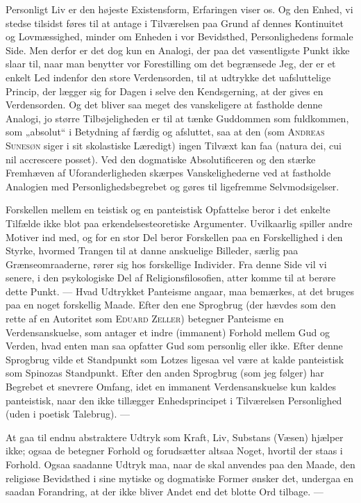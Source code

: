 \documentclass[12pt,a4paper,openany]{book}
\newcommand{\opage}[1]{\marginnote{\footnotesize\textit{[#1]}}}
\begin{document}
Personligt Liv er den højeste Existensform, Erfaringen viser os. Og den
Enhed, vi stedse tilsidst føres til at antage i Tilværelsen paa Grund af
dennes Kontinuitet og Lovmæssighed, minder om Enheden i vor Bevidsthed,
Personlighedens formale Side. Men derfor er det dog kun en Analogi, der
paa det væsentligste Punkt ikke slaar til, naar man benytter vor
Forestilling om det begrænsede Jeg, der er et enkelt Led indenfor den
store Verdensorden, til at udtrykke det uafsluttelige Princip, der
lægger sig for Dagen i selve den Kendsgerning, at der gives en
Verdensorden. Og det bliver saa meget des vanskeligere at fastholde
denne Analogi, jo større Tilbøjeligheden er til at tænke Guddommen som
fuldkommen, som „absolut“ i Betydning af færdig og afsluttet, saa at den
(som \textsc{Andreas Sunesøn} siger i sit skolastiske Læredigt) ingen
Tilvæxt kan faa (natura dei, cui nil accrescere posset). Ved den
dogmatiske Absolutificeren og den stærke Fremhæven af Uforanderligheden
skærpes Vanskelighederne ved at fastholde Analogien med
Personlighedsbegrebet og gøres til ligefremme Selvmodsigelser.

Forskellen mellem en teistisk og en panteistisk Opfattelse beror i det
enkelte Tilfælde ikke blot paa erkendelsesteoretiske Argumenter.
Uvilkaarlig spiller andre Motiver ind med, og for en stor Del beror
Forskellen paa en Forskellighed i den Styrke, hvormed Trangen til at
danne anskuelige Billeder, særlig paa Grænseomraaderne, rører sig hos
forskellige Individer. Fra denne Side vil vi senere, i den psykologiske
Del af Religionsfilosofien, atter
\opage{46}komme til at berøre dette Punkt. --- Hvad Udtrykket Panteisme
angaar, maa bemærkes, at det bruges paa en noget forskellig Maade. Efter
den ene Sprogbrug (der hævdes som den rette af en Autoritet som
\textsc{Eduard Zeller}) betegner Panteisme en Verdensanskuelse, som
antager et indre (immanent) Forhold mellem Gud og Verden, hvad enten man
saa opfatter Gud som personlig eller ikke. Efter denne Sprogbrug vilde
et Standpunkt som Lotzes ligesaa vel være at kalde panteistisk som
Spinozas Standpunkt. Efter den anden Sprogbrug (som jeg følger) har
Begrebet et snevrere Omfang, idet en immanent Verdensanskuelse kun
kaldes panteistisk, naar den ikke tillægger Enhedsprincipet i
Tilværelsen Personlighed (uden i poetisk Talebrug). ---

At gaa til endnu abstraktere Udtryk som Kraft, Liv, Substans (Væsen)
hjælper ikke; ogsaa de betegner Forhold og forudsætter altsaa Noget,
hvortil der staas i Forhold. Ogsaa saadanne Udtryk maa, naar de skal
anvendes paa den Maade, den religiøse Bevidsthed i sine mytiske og
dogmatiske Former ønsker det, undergaa en saadan Forandring, at der ikke
bliver Andet end det blotte Ord tilbage. ---
\end{document}
